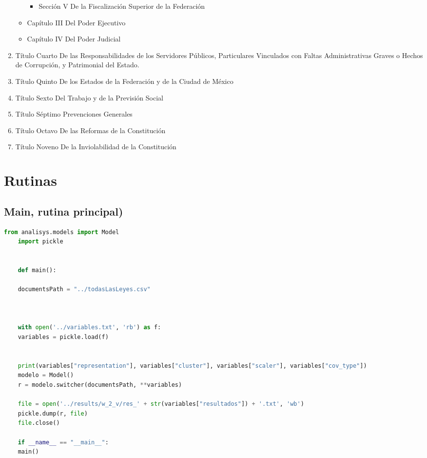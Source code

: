\documentclass[12pt]{article}
\begin{document}
\begin{enumerate}
\begin{itemize}
\begin{itemize}
							\item Sección V De la Fiscalización Superior de la Federación 
						\end{itemize}
	
					
					\item Capítulo III Del Poder Ejecutivo
					
					\item Capítulo IV Del Poder Judicial
				\end{itemize}
	
			
			\item Título Cuarto De las Responsabilidades de los Servidores Públicos, Particulares Vinculados con Faltas Administrativas Graves o Hechos de Corrupción, y Patrimonial del Estado.
			
			\item Título Quinto De los Estados de la Federación y de la Ciudad de México 
			
			\item Título Sexto Del Trabajo y de la Previsión Social
			
			\item Título Séptimo Prevenciones Generales
			
			\item Título Octavo De las Reformas de la Constitución
			
			\item Título Noveno De la Inviolabilidad de la Constitución
			
		\end{enumerate}
	
	\section{Rutinas}	
	\subsection{Main, rutina principal)}
	\begin{lstlisting}[language=Python, caption= Main]
	from analisys.models import Model
	import pickle
	
	
	def main():
	
	documentsPath = "../todasLasLeyes.csv"
	
	
	
	with open('../variables.txt', 'rb') as f:
	variables = pickle.load(f)
	
	
	print(variables["representation"], variables["cluster"], variables["scaler"], variables["cov_type"])
	modelo = Model()
	r = modelo.switcher(documentsPath, **variables)
	
	file = open('../results/w_2_v/res_' + str(variables["resultados"]) + '.txt', 'wb')
	pickle.dump(r, file)
	file.close()
	
	if __name__ == "__main__":
	main()
	\end{lstlisting}
	
\end{document}
